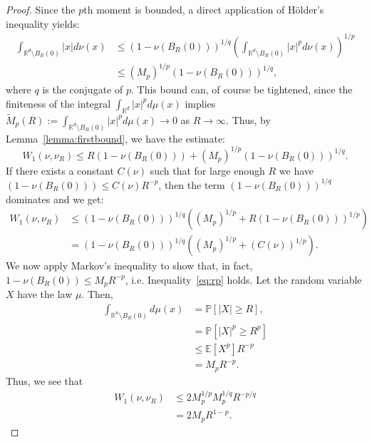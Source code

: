 \documentclass{amsart}
\theoremstyle{lemma}
\theoremstyle{remark}
\begin{document}
\begin{proof}
Since the $p$th moment is bounded, a direct application of H\"{o}lder's inequality yields:
\begin{align}
\int_{\mathbb{R}^d \setminus B_{R}(0)} \left\vert x \right\vert d\nu(x) &\leq (1-\nu(B_{R}(0)))^{1/q}\left( \int_{\mathbb{R}^d \setminus B_{R}(0)} \left\vert x \right\vert^p d\nu(x) \right)^{1/p} \\
&\leq (M_p)^{1/p} (1-\nu(B_{R}(0)))^{1/q},
\end{align}
where $q$ is the conjugate of $p$. This bound can, of course be tightened, since the finiteness of the integral $\int_{\mathbb{R}^d} \left\vert x \right\vert^p d\mu(x)$ implies $\tilde{M}_{p}(R) := \int_{\mathbb{R}^d \setminus B_{R}(0)} \left\vert x \right\vert^p d\mu(x) \rightarrow 0$ as $R \rightarrow \infty$. Thus, by Lemma~\ref{lemma:firstbound}, we have the estimate:
\begin{equation}
W_1(\nu, \nu_{R}) \leq R(1 - \nu(B_{R}(0))) + (M_p)^{1/p}(1 - \nu(B_{R}(0)))^{1/q}.
\end{equation}
If there exists a constant $C(\nu)$ such that for large enough $R$ we have $(1 - \nu(B_{R}(0))) \leq C(\nu) R^{-p}$, then the term $(1-\nu(B_{R}(0)))^{1/q}$ dominates and we get:
\begin{align}\label{eq:rp}
W_1(\nu, \nu_{R}) &\leq (1 - \nu(B_{R}(0)))^{1/q} \left((M_p)^{1/p} + R(1-\nu(B_{R}(0)))^{1/p} \right) \\
&= (1 - \nu(B_{R}(0)))^{1/q} \left((M_p)^{1/p} + (C(\nu))^{1/p} \right).
\end{align}
We now apply Markov's inequality to show that, in fact, $1 - \nu(B_{R}(0)) \leq M_{p} R^{-p}$, i.e. Inequality~\eqref{eq:rp} holds. Let the random variable $X$ have the law $\mu$. Then,
\begin{align}\label{eq:Markov}
\int_{\mathbb{R}^n \setminus B_{R}(0)} d\mu(x) &= \mathbb{P}[\vert X \vert \geq R], \\
&= \mathbb{P}[\vert X \vert^{p} \geq R^{p}] \\
&\leq \mathbb{E}[X^p]R^{-p} \\
&= M_p R^{-p}.
\end{align}
Thus, we see that
\begin{align}
W_{1}(\nu, \nu_{R}) &\leq 2M_p^{1/p} M_{p}^{1/q} R^{-p/q} \\
&= 2M_p R^{1 - p}.
\end{align}
\end{proof}
\end{document}
